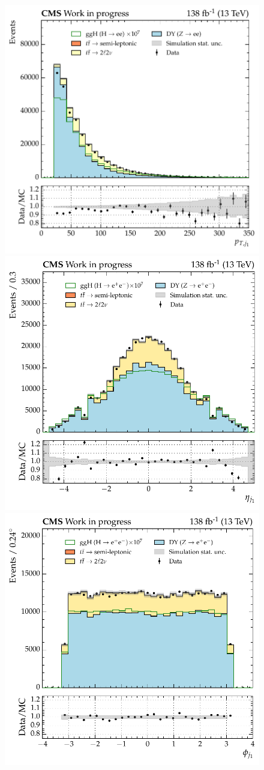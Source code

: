 \begin{figure}[htbp!]
\centering
\includegraphics[width =0.33\linewidth]{Figures/Hee/ggH/dataMC/all_inputs/ggH_BDT_pt_reweighted_leadJetPt.pdf}\hfill%
\includegraphics[width =0.33\linewidth]{Figures/Hee/ggH/dataMC/all_inputs/ggH_BDT_pt_reweighted_leadJetEta.pdf}\hfill%
\includegraphics[width =0.33\linewidth]{Figures/Hee/ggH/dataMC/all_inputs/ggH_BDT_pt_reweighted_leadJetPhi.pdf}\hfill%
 

\end{figure}
